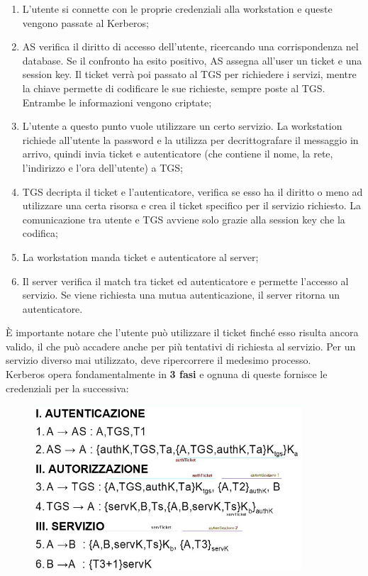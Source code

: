 \begin{enumerate}
      \item L’utente si connette con le proprie credenziali alla workstation e
            queste vengono passate al Kerberos;
      \item AS verifica il diritto di accesso dell’utente, ricercando una
            corrispondenza nel database. Se il confronto ha esito positivo, AS
            assegna all’user un ticket e una session key.
            Il ticket verrà poi passato al TGS per richiedere i servizi, mentre
            la chiave permette di codificare le sue richieste, sempre poste al TGS.
            Entrambe le informazioni vengono criptate;
      \item L’utente a questo punto vuole utilizzare un certo servizio.
            La workstation richiede all'utente la password e la utilizza per
            decrittografare il messaggio in arrivo, quindi invia ticket e
            autenticatore
            (che contiene il nome, la rete, l'indirizzo e l'ora dell'utente) a TGS;
      \item TGS decripta il ticket e l'autenticatore, verifica se esso ha il
            diritto o meno ad utilizzare una certa risorsa e crea il ticket
            specifico per il servizio richiesto. La comunicazione tra utente e
            TGS avviene solo grazie alla session key che la codifica;
      \item La workstation manda ticket e autenticatore al server;
      \item Il server verifica il match tra ticket ed autenticatore e permette
            l’accesso al servizio. Se
            viene richiesta una mutua autenticazione, il server ritorna un
            autenticatore.
\end{enumerate}

È importante notare che l’utente può utilizzare il ticket finché esso risulta
ancora valido, il che può accadere anche per più tentativi di richiesta al servizio.
Per un servizio diverso mai utilizzato, deve ripercorrere il medesimo processo.\\

Kerberos opera fondamentalmente in \textbf{3 fasi} e ognuna di queste fornisce
le credenziali per la successiva:

\begin{figure}[H]
      \centering
      \includegraphics[width=10cm]{capitoli/autenticazione/imgs/kerberos2.png}
\end{figure}


